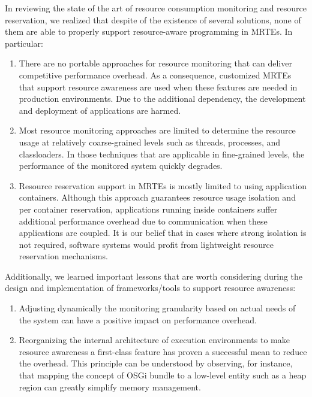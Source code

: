 In reviewing the state of the art of resource consumption monitoring and resource reservation, we realized that despite of the existence of several solutions, none of them are able to properly support resource-aware programming in MRTEs.
In particular:
\begin{enumerate}
\item There are no portable approaches for resource monitoring that can deliver competitive performance overhead.
As a consequence, customized MRTEs that support resource awareness are used when these features are needed in production environments.
Due to the additional dependency, the development and deployment of applications are harmed.

\item Most resource monitoring approaches are limited to determine the resource usage at relatively coarse-grained levels  such as threads, processes, and classloaders.
In those techniques that are applicable in fine-grained levels, the performance of the monitored system quickly degrades. 

\item Resource reservation support in MRTEs is mostly limited to using application containers.
Although this approach guarantees resource usage isolation and per container reservation, applications running inside containers suffer additional performance overhead due to communication when these applications are coupled.
It is our belief that in cases where strong isolation is not required, software systems would profit from lightweight resource reservation mechanisms. 
\end{enumerate}

Additionally, we learned important lessons that are worth considering during the design and implementation of frameworks/tools to support resource awareness:
\begin{enumerate}
\item Adjusting dynamically the monitoring granularity based on actual needs of the system can have
a positive impact on performance overhead.

\item Reorganizing the internal architecture of execution environments to make resource awareness a first-class feature has proven a successful mean to reduce the overhead.
This principle can be understood by observing, for instance, that mapping the concept of OSGi bundle to a low-level entity such as a heap region can greatly simplify memory management. 
\end{enumerate}

